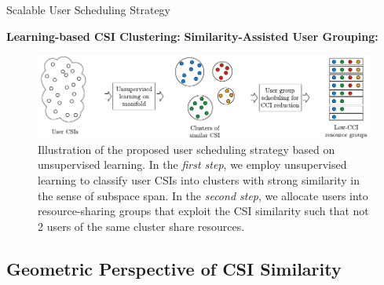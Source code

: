 \begin{algorithm}[htb]
	\caption{Scalable User Scheduling Strategy}
	\label{usch:alg:uplink_scheduling}
	\begin{algorithmic}[1]
		\Statex \textbf{Learning-based CSI Clustering:}
		\Statex \textbf{Similarity-Assisted User Grouping:}
	\end{algorithmic}
\end{algorithm}

\begin{figure}[htb]
	\centering
	\includegraphics[width=.95\linewidth]{./figs/usch_figs/strategy6.pdf}
	\caption[Illustration of the proposed user scheduling strategy based on unsupervised learning.]{Illustration of the proposed user scheduling strategy based on unsupervised learning. In the \emph{first step}, we employ unsupervised learning to classify user CSIs into clusters with strong similarity in the sense of subspace span. In the \emph{second step}, we allocate users into resource-sharing groups that exploit the CSI similarity such that not 2 users of the same cluster share resources.}	\label{usch:fig:strategy}
\end{figure}



\subsection{Geometric Perspective of CSI Similarity}

